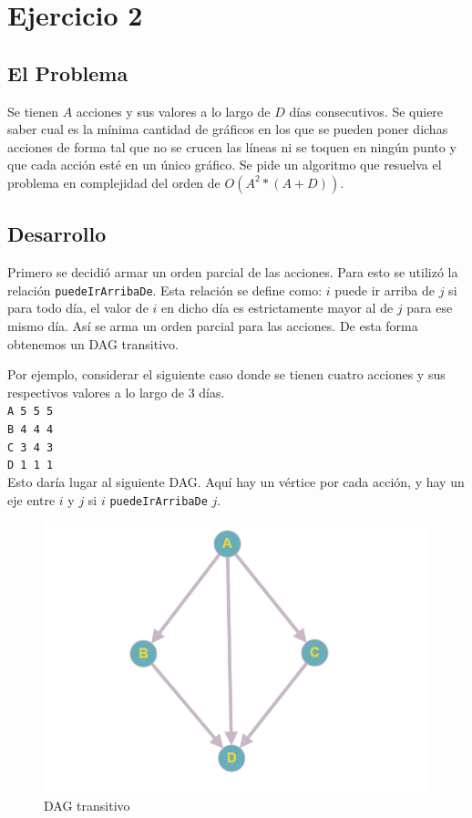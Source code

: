 \section{Ejercicio 2}
\subsection{El Problema}

Se tienen $A$ acciones y sus valores a lo largo de $D$ días consecutivos. Se quiere saber cual es la mínima cantidad de gráficos en los que se pueden poner dichas acciones de forma tal que no se crucen las líneas ni se toquen en ningún punto y que cada acción esté en un único gráfico. Se pide un algoritmo que resuelva el problema en complejidad del orden de $O(A^2 * (A+D))$.

\subsection{Desarrollo}

Primero se decidió armar un orden parcial de las acciones. Para esto se utilizó la relación \texttt{puedeIrArribaDe}. Esta relación se define como: $i$ puede ir arriba de $j$ si para todo día, el valor de $i$ en dicho día es estrictamente mayor al de $j$ para ese mismo día. Así se arma un orden parcial para las acciones. De esta forma obtenemos un DAG transitivo.

Por ejemplo, considerar el siguiente caso donde se tienen cuatro acciones y sus respectivos valores a lo largo de 3 días.\\

\noindent \texttt{A 5 5 5} \\
\texttt{B 4 4 4} \\
\texttt{C 3 4 3} \\
\texttt{D 1 1 1} \\

Esto daría lugar al siguiente DAG. Aquí hay un vértice por cada acción, y hay un eje entre $i$ y $j$ si $i$ \texttt{puedeIrArribaDe} $j$.

\begin{figure}[H]
\centering
\includegraphics[width=15cm]{Imagenes/Ej2a.png}
\caption{DAG transitivo}
\end{figure}

